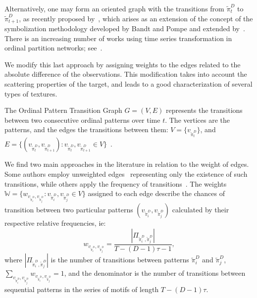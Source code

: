 \documentclass[paper=letter, fontsize=12pt]{article}
\begin{document}
	Alternatively, one may form an oriented graph with the transitions from $\widetilde\pi_t^D$ to $\widetilde\pi_{t+1}^D$, as recently proposed by~\cite{Small2015lagged}, which arises as an extension of the concept of the symbolization methodology developed by Bandt and Pompe and extended by~\cite{cao2004detecting}.
	There is an increasing number of works using time series transformation in ordinal partition networks; see~\cite{Small2015lagged,kulp2016using,sun2014characterizing,Sorrentino2015Semiconductor, Guo2018Cross}. 
	
	
	We modify this last approach by assigning weights to the edges related to the absolute difference of the observations.
	This modification takes into account the scattering properties of the target, and leads to a good characterization of several types of textures.
	
	The Ordinal Pattern Transition Graph ${G} = ({V}, {E})$ 
	represents the transitions between two consecutive ordinal patterns over time $t$.
	The vertices are the patterns, and the edges the transitions between them:
	$V = \{v_{\widetilde\pi_t^D}\}$, and 
	$E = \{(v_{\widetilde\pi_t^D}, v_{\widetilde\pi_{t+1}^D}): v_{\widetilde\pi_t^D}, v_{\widetilde\pi_{t+1}^D} \in V \}$~\cite{LearningandDistinguishingTimeSeriesDynamicsViaOrdinalPatternsTransitionGraphs2019}.
	
	We find two main approaches in the literature in relation to the weight of edges.
	Some authors employ unweighted edges~\cite{Kulp2016ordinal,McCullough2015lagged} representing only the existence of such transitions, while others apply the frequency of transitions~\cite{Sorrentino2015periodic,Zhang2017ConstructingOP}.
	The weights $\mathbb{W} = \{w_{v_{\widetilde{\pi}^D_i}, v_{\widetilde\pi^D_j}}: v_{\widetilde\pi^D_i}, v_{\widetilde\pi^D_j} \in V \}$ assigned to each edge describe the chances of transition between two particular patterns $(v_{\widetilde\pi^D_i}, v_{\widetilde\pi^D_j})$ calculated by their respective relative frequencies, ie:
	\begin{equation}
	w_{v_{\widetilde\pi^D_i}, v_{\widetilde\pi^D_j}} = \frac{|\Pi_{\widetilde\pi^D_i,\widetilde\pi^D_j}|}{T-(D-1)\tau-1},
	\end{equation}
	where $|\Pi_{\widetilde\pi^D_i,\widetilde\pi^D_j}|$ is the number of transitions between patterns $\widetilde\pi^D_i$ and $\widetilde\pi^D_j$, $\sum_{v_{\widetilde\pi^D_i}, v_{\widetilde\pi^D_j}}w_{v_{\widetilde\pi^D_i}, v_{\widetilde\pi^D_j}} = 1$,
	and the denominator is the number of transitions between sequential patterns in the series of motifs of length $T-(D-1)\tau$.
	
\end{document}
